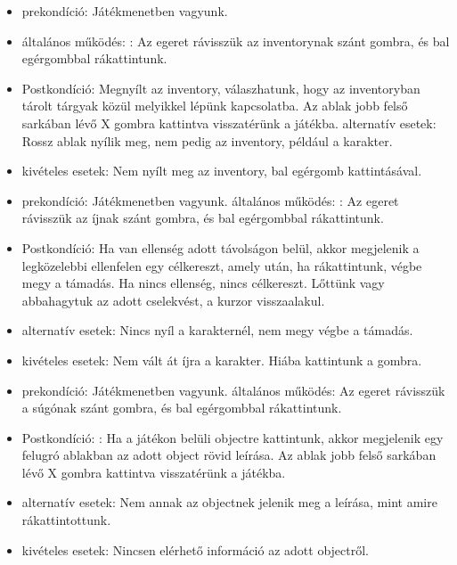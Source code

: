
\begin{itemize}
    \item prekondíció: Játékmenetben vagyunk.
    \item általános működés: : Az egeret rávisszük az inventorynak szánt gombra, és bal egérgombbal rákattintunk.
    \item Postkondíció: Megnyílt az inventory, válaszhatunk, hogy az inventoryban tárolt tárgyak közül melyikkel lépünk kapcsolatba. Az ablak jobb felső sarkában lévő X gombra kattintva visszatérünk a játékba.
    alternatív esetek: Rossz ablak nyílik meg, nem pedig az inventory, például a karakter.
    \item kivételes esetek: Nem nyílt meg az inventory, bal egérgomb kattintásával.
\end{itemize}


\begin{itemize}
    \item prekondíció: Játékmenetben vagyunk.
    általános működés: : Az egeret rávisszük az íjnak szánt gombra, és bal egérgombbal rákattintunk.
    \item Postkondíció: Ha van ellenség adott távolságon belül, akkor megjelenik a legközelebbi ellenfelen egy célkereszt, amely után, ha rákattintunk, végbe megy a támadás. Ha nincs ellenség, nincs célkereszt.
    Lőttünk vagy abbahagytuk az adott cselekvést, a kurzor visszaalakul.
    \item alternatív esetek: Nincs nyíl a karakternél, nem megy végbe a támadás.
    \item kivételes esetek: Nem vált át íjra a karakter. Hiába kattintunk a gombra.
\end{itemize}


\begin{itemize}
    \item prekondíció: Játékmenetben vagyunk.
    általános működés: Az egeret rávisszük a súgónak szánt gombra, és bal egérgombbal rákattintunk.
    \item Postkondíció: : Ha a játékon belüli objectre kattintunk, akkor megjelenik egy felugró ablakban az adott object rövid leírása. Az ablak jobb felső sarkában lévő X gombra kattintva visszatérünk a játékba.
    \item alternatív esetek: Nem annak az objectnek jelenik meg a leírása, mint amire rákattintottunk.
    \item kivételes esetek: Nincsen elérhető információ az adott objectről.
\end{itemize}

